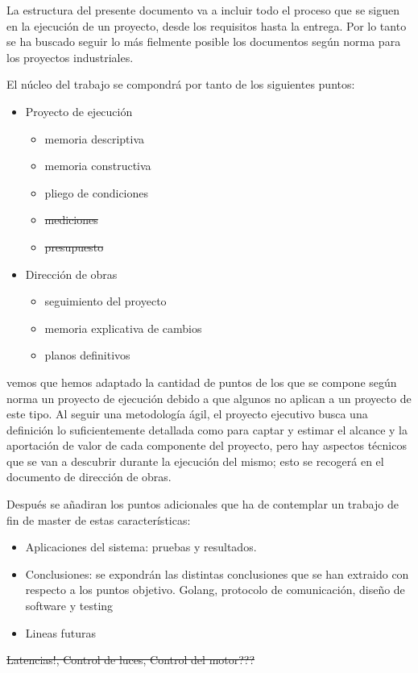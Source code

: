 La estructura del presente documento va a incluir todo el proceso que se siguen en la ejecución de un proyecto, desde los requisitos hasta la entrega. Por lo tanto se ha buscado seguir lo más fielmente posible los documentos según norma para los proyectos industriales.

El núcleo del trabajo se compondrá por tanto de los siguientes puntos:

\begin{itemize}
    \item Proyecto de ejecución
    \begin{itemize}
        \item memoria descriptiva
        \item memoria constructiva
        \item pliego de condiciones
        \item \sout{mediciones}
        \item \sout{presupuesto}
    \end{itemize}
    \item Dirección de obras
    \begin{itemize}
        \item seguimiento del proyecto
        \item memoria explicativa de cambios
        \item planos definitivos
    \end{itemize}
\end{itemize}

vemos que hemos adaptado la cantidad de puntos de los que se compone según norma un proyecto de ejecución debido a que algunos no aplican a un proyecto de este tipo. Al seguir una metodología ágil, el proyecto ejecutivo busca una definición lo suficientemente detallada como para captar y estimar el alcance y la aportación de valor de cada componente del proyecto, pero hay aspectos técnicos que se van a descubrir durante la ejecución del mismo; esto se recogerá en el documento de dirección de obras.

Después se añadiran los puntos adicionales que ha de contemplar un trabajo de fin de master de estas características:
\begin{itemize}
    \item Aplicaciones del sistema: pruebas y resultados.
    \item Conclusiones: se expondrán las distintas conclusiones que se han extraido con respecto a los puntos objetivo. Golang, protocolo de comunicación, diseño de software y testing
    \item Lineas futuras

\end{itemize}

\sout{Latencias!, Control de luces, Control del motor???}